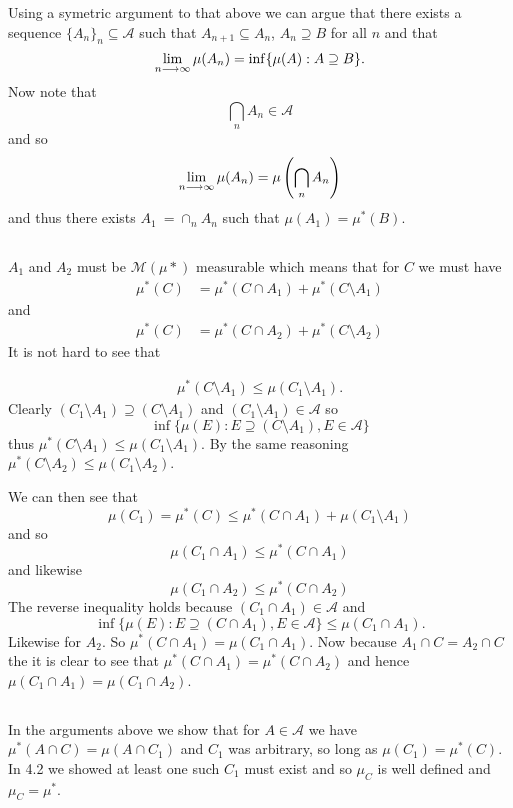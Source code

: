 \documentclass{unswmaths}
\begin{document}
Using a symetric argument to that above we can argue that there exists a sequence
$ \{ A_n \}_n \subseteq \mathcal{A} $ such that $ A_{n+1} \subseteq A_n $, $ A_n \supseteq B $ for all $ n $ and that 
$$ \lim_{n \longrightarrow \infty} \mu(A_n) = \inf\{ \mu(A) : A \supseteq B \}. $$
Now note that
$$
    \bigcap_{n} A_n \in \mathcal{A}
$$
and so
$$
    \lim_{n \longrightarrow \infty} \mu(A_n) = \mu\left( \bigcap_n A_n \right)
$$
and thus there exists $ A_1 \:= \cap_n A_n $ such that $ \mu(A_1) = \mu^*(B) $.
\subsection{}
$ A_1 $ and $ A_2 $ must be $\mathcal{M}( \mu*) $ measurable which means that for $ C $ we must have
\begin{align*}
    \mu^*(C) &= \mu^*(C \cap A_1) + \mu^*(C \setminus A_1 ) 
\end{align*}
and
\begin{align*}
    \mu^*(C) &= \mu^*(C \cap A_2) + \mu^*(C \setminus A_2) 
\end{align*}
It is not hard to see that

\begin{align*}
   \mu^*(C \setminus A_1) \leq \mu(C_1 \setminus A_1).
\end{align*}
Clearly $ (C_1 \setminus A_1) \supseteq (C \setminus A_1) $ and $ (C_1 \setminus A_1) \in \mathcal{A} $ so
$$ \inf\{ \mu(E) : E \supseteq (C \setminus A_1), E \in \mathcal{A} \} $$
thus $ \mu^*(C \setminus A_1) \leq \mu(C_1 \setminus A_1) $. By the same reasoning $ \mu^*(C \setminus A_2) \leq \mu(C_1 \setminus A_2) $. 

We can then see that
$$
    \mu(C_1) = \mu^*(C) \leq \mu^*(C\cap A_1) + \mu(C_1 \setminus A_1 )
$$
and so
$$
    \mu(C_1 \cap A_1) \leq \mu^*(C \cap A_1)
$$
and likewise
$$
    \mu(C_1 \cap A_2) \leq \mu^*(C \cap A_2)
$$
The reverse inequality holds because $ (C_1 \cap A_1) \in \mathcal{A} $ and 
$$ \inf\{ \mu(E) : E \supseteq (C \cap A_1), E \in \mathcal{A} \} \leq \mu(C_1 \cap A_1). $$
Likewise for $ A_2 $. So $ \mu^*(C \cap A_1) = \mu( C_1 \cap A_1 )$. Now because $ A_1\cap C = A_2\cap C $ the  it is clear to see
that $ \mu^*(C \cap A_1) = \mu^*( C \cap A_2) $ and hence $ \mu(C_1 \cap A_1) = \mu(C_1 \cap A_2) $.
\subsection{}

In the arguments above we show that for $ A \in \mathcal{A} $ we have $ \mu^*(A \cap C) = \mu(A \cap C_1) $ and $ C_1 $ was arbitrary, so long as $ \mu(C_1) = \mu^*(C) $. In 4.2 we showed at least one such $ C_1 $ must exist and so $ \mu_C $ is well defined and $ \mu_C = \mu^* $. 
\end{document}
